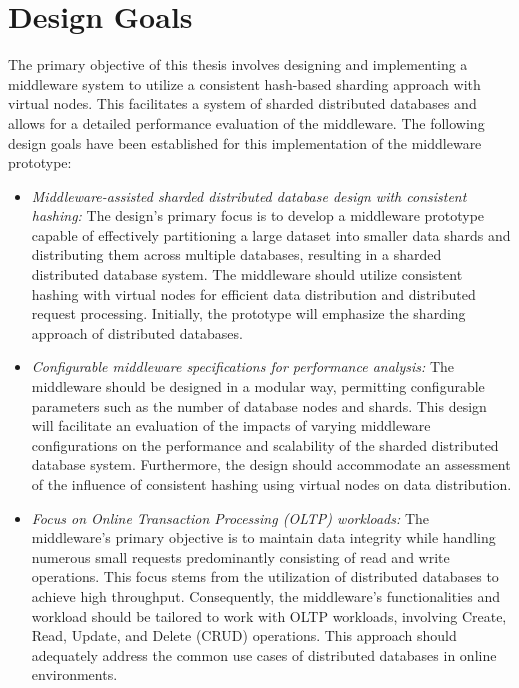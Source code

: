 \section{Design Goals}
\label{goals}
The primary objective of this thesis involves designing and implementing a middleware system to utilize a consistent hash-based sharding approach with virtual nodes. This facilitates a system of sharded distributed databases and allows for a detailed performance evaluation of the middleware. The following design goals have been established for this implementation of the middleware prototype:
\begin{itemize}
\item[-] \textit{Middleware-assisted sharded distributed database design with consistent hashing:} The design’s primary focus is to develop a middleware prototype capable of effectively partitioning a large dataset into smaller data shards and distributing them across multiple databases, resulting in a sharded distributed database system. The middleware should utilize consistent hashing with virtual nodes for efficient data distribution and distributed request processing. Initially, the prototype will emphasize the sharding approach of distributed databases. 
\item[-] \textit{Configurable middleware specifications for performance analysis:} The middleware should be designed in a modular way, permitting configurable parameters such as the number of database nodes and shards. This design will facilitate an evaluation of the impacts of varying middleware configurations on the performance and scalability of the sharded distributed database system. Furthermore, the design should accommodate an assessment of the influence of consistent hashing using virtual nodes on data distribution.
\item[-] \textit{Focus on Online Transaction Processing (OLTP) workloads:} The middleware's primary objective is to maintain data integrity while handling numerous small requests predominantly consisting of read and write operations. This focus stems from the utilization of distributed databases to achieve high throughput. Consequently, the middleware's functionalities and workload should be tailored to work with OLTP workloads, involving Create, Read, Update, and Delete (CRUD) operations. This approach should adequately address the common use cases of distributed databases in online environments.

\end{itemize}


